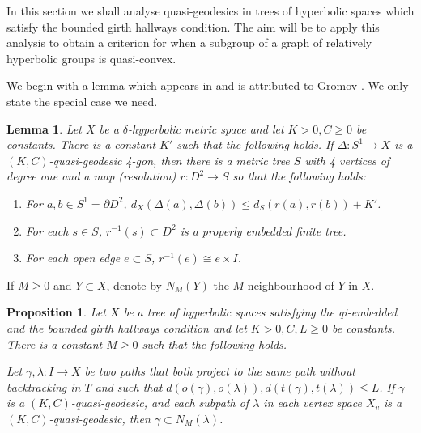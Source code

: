 \documentclass[11pt, a4paper]{amsart}
\newtheorem{lemma}[theorem]{Lemma}
\newtheorem{proposition}[theorem]{Proposition}
\theoremstyle{definition}
\begin{document}
In this section we shall analyse quasi-geodesics in trees of hyperbolic spaces which satisfy the bounded girth hallways condition. The aim will be to apply this analysis to obtain a criterion for when a subgroup of a graph of relatively hyperbolic groups is quasi-convex.

We begin with a lemma which appears in \cite{BF92} and is attributed to Gromov \cite{Gr87}. We only state the special case we need.

\begin{lemma}
\label{lem:qg_4-gon}
Let $X$ be a $\delta$-hyperbolic metric space and let $K>0, C\geqslant 0$ be constants. There is a constant $K'$ such that the following holds.  If $\Delta\colon S^1\to X$ is a $(K, C)$-quasi-geodesic 4-gon, then there is a metric tree $S$ with 4 vertices of degree one and a map (resolution) $r\colon D^2\to S$ so that the following holds:
\begin{enumerate}
\item For $a, b\in S^1 = \partial D^2$, $d_X(\Delta(a), \Delta(b))\leqslant d_S(r(a), r(b)) + K'$.
\item For each $s\in S$, $r^{-1}(s)\subset D^2$ is a properly embedded finite tree.
\item For each open edge $e\subset S$, $r^{-1}(e) \cong e\times I$.
\end{enumerate}
\end{lemma}

If $M\geqslant 0$ and $Y\subset X$, denote by $N_M(Y)$ the $M$-neighbourhood of $Y$ in $X$.

\begin{proposition}
\label{prop:qg_track}
Let $X$ be a tree of hyperbolic spaces satisfying the qi-embedded and the bounded girth hallways condition and let $K>0, C, L\geqslant 0$ be constants. There is a constant $M\geqslant 0$ such that the following holds. 

Let $\gamma, \lambda\colon I\to X$ be two paths that both project to the same path without backtracking in $T$ and such that $d(o(\gamma), o(\lambda)), d(t(\gamma), t(\lambda))\leqslant L$. If $\gamma$ is a $(K, C)$-quasi-geodesic, and each subpath of $\lambda$ in each vertex space $X_v$ is a $(K, C)$-quasi-geodesic, then $\gamma\subset N_M(\lambda)$.
\end{proposition}
\end{document}
